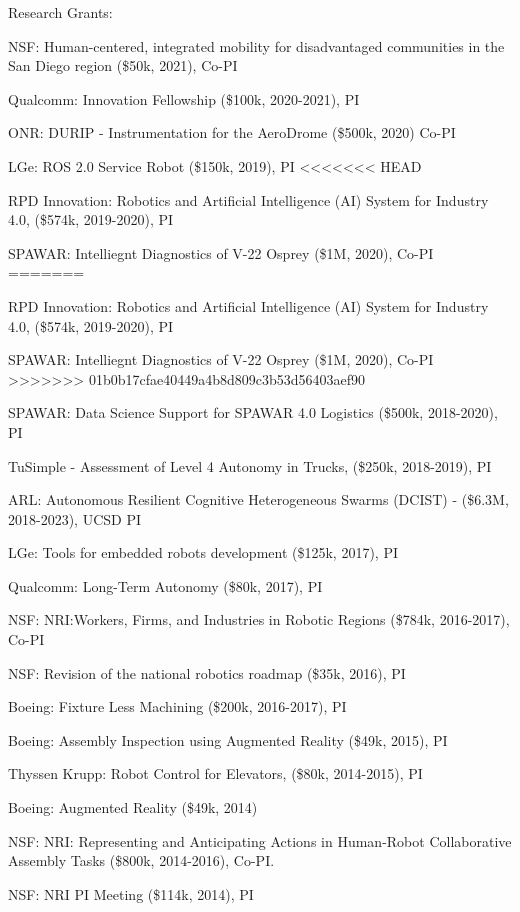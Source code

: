 \documentclass{article}
\begin{document}
\begin{cv}
\begin{cvlist}{Research Grants:}
\item NSF: Human-centered, integrated mobility for disadvantaged
  communities in the San Diego region (\$50k, 2021), Co-PI
\item Qualcomm: Innovation Fellowship (\$100k, 2020-2021), PI
\item ONR: DURIP - Instrumentation for the AeroDrome (\$500k, 2020) Co-PI
\item LGe: ROS 2.0 Service Robot (\$150k, 2019), PI
<<<<<<< HEAD
\item RPD Innovation: Robotics and Artificial Intelligence (AI) System for 
  Industry 4.0, (\$574k, 2019-2020), PI 
\item SPAWAR: Intelliegnt Diagnostics of V-22 Osprey (\$1M, 2020), Co-PI   
=======
\item RPD Innovation: Robotics and Artificial Intelligence (AI) System for
  Industry 4.0, (\$574k, 2019-2020), PI
\item SPAWAR: Intelliegnt Diagnostics of V-22 Osprey (\$1M, 2020), Co-PI
>>>>>>> 01b0b17cfae40449a4b8d809c3b53d56403aef90
\item SPAWAR: Data Science Support for SPAWAR 4.0 Logistics (\$500k,
  2018-2020), PI
\item TuSimple - Assessment of Level 4 Autonomy in Trucks,  (\$250k,
  2018-2019), PI
\item ARL: Autonomous Resilient Cognitive Heterogeneous Swarms
  (DCIST) - (\$6.3M, 2018-2023), UCSD PI
\item LGe: Tools for embedded robots development (\$125k, 2017), PI
\item Qualcomm: Long-Term Autonomy (\$80k, 2017), PI
\item NSF: NRI:Workers, Firms, and Industries in Robotic Regions
  (\$784k, 2016-2017), Co-PI
\item NSF: Revision of the national robotics roadmap (\$35k, 2016), PI
\item Boeing: Fixture Less Machining (\$200k, 2016-2017), PI
\item Boeing: Assembly Inspection using Augmented Reality (\$49k,
  2015), PI
\item Thyssen Krupp: Robot Control for Elevators, (\$80k, 2014-2015), PI
\item Boeing: Augmented Reality (\$49k, 2014)
\item NSF: NRI: Representing and Anticipating Actions in Human-Robot
  Collaborative Assembly Tasks (\$800k, 2014-2016), Co-PI.
\item NSF: NRI PI Meeting (\$114k, 2014), PI

\end{cvlist}
\end{cv}
\end{document}
